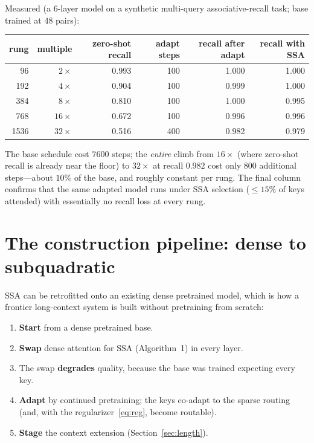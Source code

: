 \documentclass[11pt]{article}
\numberwithin{equation}{section}
\begin{document}
Measured (a $6$-layer model on a synthetic multi-query associative-recall task; base trained at $48$ pairs):

\begin{center}
\begin{tabular}{@{}rrrrrr@{}}
\toprule
rung & multiple & zero-shot recall & adapt steps & recall after adapt & recall with SSA\\
\midrule
96   & $2\times$  & 0.993 & 100 & 1.000 & 1.000\\
192  & $4\times$  & 0.904 & 100 & 0.999 & 1.000\\
384  & $8\times$  & 0.810 & 100 & 1.000 & 0.995\\
768  & $16\times$ & 0.672 & 100 & 0.996 & 0.996\\
1536 & $32\times$ & 0.516 & 400 & 0.982 & 0.979\\
\bottomrule
\end{tabular}
\end{center}

The base schedule cost $7600$ steps; the \emph{entire} climb from $16\times$ (where zero-shot recall is already
near the floor) to $32\times$ at recall $0.982$ cost only $800$ additional steps---about $10\%$ of the base, and
roughly constant per rung. The final column confirms that the same adapted model runs under SSA selection
($\le15\%$ of keys attended) with essentially no recall loss at every rung.

\section{The construction pipeline: dense to subquadratic}\label{sec:pipeline}

SSA can be retrofitted onto an existing dense pretrained model, which is how a frontier long-context system is
built without pretraining from scratch:
\begin{enumerate}
\item \textbf{Start} from a dense pretrained base.
\item \textbf{Swap} dense attention for SSA (Algorithm~1) in every layer.
\item The swap \textbf{degrades} quality, because the base was trained expecting every key.
\item \textbf{Adapt} by continued pretraining; the keys co-adapt to the sparse routing (and, with the
  regularizer~\eqref{eq:reg}, become routable).
\item \textbf{Stage} the context extension (Section~\ref{sec:length}).
\end{enumerate}
\end{document}
